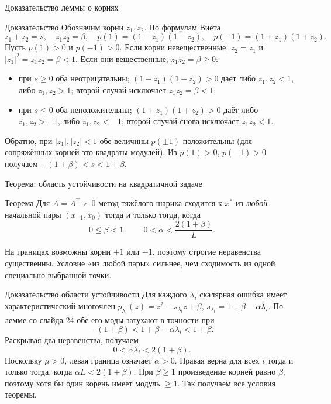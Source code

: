 \documentclass[aspectratio=169,10pt]{beamer}
\begin{document}
\begin{frame}{Доказательство леммы о корнях}
\small
\begin{block}{Доказательство}
Обозначим корни $z_1,z_2$. По формулам Виета
\[z_1+z_2=s,\quad z_1z_2=\beta,\quad
p(1)=(1-z_1)(1-z_2),\quad p(-1)=(1+z_1)(1+z_2).\]
Пусть $p(1)>0$ и $p(-1)>0$.
Если корни невещественные, $z_2=\overline z_1$ и
$|z_1|^2=z_1z_2=\beta<1$.
Если они вещественные, $z_1z_2=\beta\ge0$:
\begin{itemize}
\item при $s\ge0$ оба неотрицательны;
$(1-z_1)(1-z_2)>0$ даёт либо $z_1,z_2<1$, либо $z_1,z_2>1$; второй случай исключает $z_1z_2=\beta<1$;
\item при $s\le0$ оба неположительны;
$(1+z_1)(1+z_2)>0$ даёт либо $z_1,z_2>-1$, либо $z_1,z_2<-1$; второй случай снова исключает $z_1z_2<1$.
\end{itemize}
Обратно, при $|z_1|,|z_2|<1$ обе величины $p(\pm1)$ положительны (для сопряжённых корней это квадраты модулей). Из $p(1)>0$, $p(-1)>0$ получаем $-(1+\beta)<s<1+\beta$.
\end{block}
\end{frame}

\begin{frame}{Теорема: область устойчивости на квадратичной задаче}
\small
\begin{block}{Теорема}
Для $A=A^\top\succ0$ метод тяжёлого шарика сходится к $x^*$ из \emph{любой} начальной пары $(x_{-1},x_0)$ тогда и только тогда, когда
\[
\boxed{0\le\beta<1,\qquad 0<\alpha<\frac{2(1+\beta)}{L}.}
\]
\end{block}
На границах возможны корни $+1$ или $-1$, поэтому строгие неравенства существенны. Условие «из любой пары» сильнее, чем сходимость из одной специально выбранной точки.
\end{frame}

\begin{frame}{Доказательство области устойчивости}
\small
Для каждого $\lambda_i$ скалярная ошибка имеет характеристический многочлен
$p_{\lambda_i}(z)=z^2-s_{\lambda_i}z+\beta$,
$s_{\lambda_i}=1+\beta-\alpha\lambda_i$.
По лемме со слайда 24 обе его моды затухают в точности при
\[
-(1+\beta)<1+\beta-\alpha\lambda_i<1+\beta.
\]
Раскрывая два неравенства, получаем
\[
0<\alpha\lambda_i<2(1+\beta).
\]
Поскольку $\mu>0$, левая граница означает $\alpha>0$. Правая верна для всех $i$ тогда и только тогда, когда $\alpha L<2(1+\beta)$.
При $\beta\ge1$ произведение корней равно $\beta$, поэтому хотя бы один корень имеет модуль $\ge1$. Так получаем все условия теоремы.
\end{frame}
\end{document}

